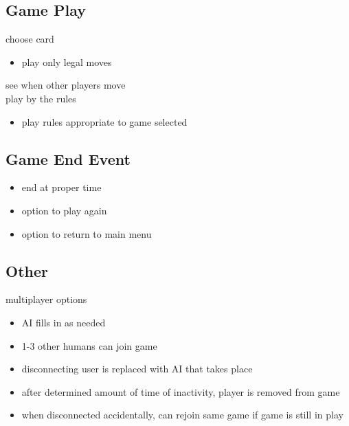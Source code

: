 \documentclass[11pt, titlepage]{article}
\begin{document}
		\subsection{Game Play}
			choose card\\
				\begin{itemize}	
					\item play only legal moves
				\end{itemize}
			see when other players move\\
			play by the rules
			\begin{itemize}
				\item play rules appropriate to game selected
				
			\end{itemize}
		\subsection{Game End Event}
			\begin{itemize}
				\item end at proper time
				\item option to play again
				\item option to return to main menu
			\end{itemize}

		\subsection{Other}	
			multiplayer options
			\begin{itemize}
				\item AI fills in as needed
				\item 1-3 other humans can join game
				\item disconnecting user is replaced with AI that takes place
				\item after determined amount of time of inactivity, player is removed from game
				\item when disconnected accidentally, can rejoin same game if game is still in play
			\end{itemize}
			
		
\end{document}
